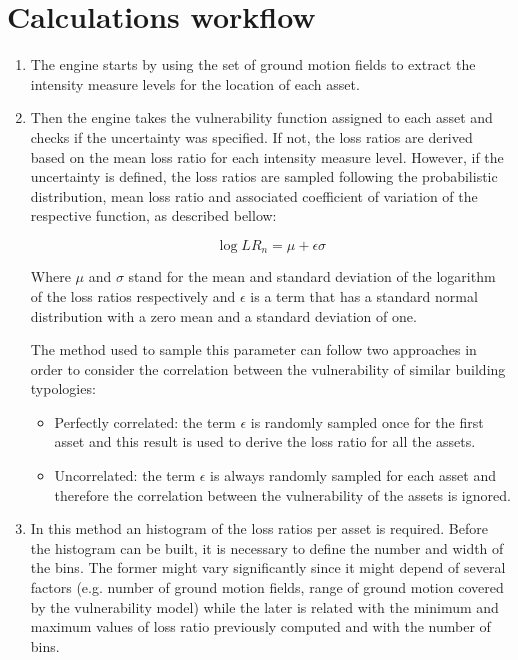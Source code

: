 \section{Calculations workflow}

\begin{enumerate}
\item The  engine starts by using the set of ground motion fields to extract the intensity measure levels for the location of each asset. 
 
\item Then the engine takes the vulnerability function assigned to each asset and checks if the uncertainty was specified. If not, the loss ratios are derived based on the mean loss ratio for each intensity measure level. However, if the uncertainty is defined, the loss ratios are sampled following the probabilistic distribution, mean loss ratio and associated coefficient of variation of the respective function, as described bellow:

\begin{equation}
\log{LR_n} = \mu + \epsilon\sigma
\end{equation}

Where $\mu$ and $\sigma$ stand for the mean and standard deviation of the logarithm of the loss ratios respectively and $\epsilon$ is a term that has a standard normal distribution with a zero mean and a standard deviation of one.  

The method used to sample this parameter can follow two approaches in order to consider the correlation between the vulnerability of similar building typologies:

\begin{itemize}

\item Perfectly correlated: the term $\epsilon$ is randomly sampled once for the first asset and this result is used to derive the loss ratio for all the assets. 

\item Uncorrelated: the term $\epsilon$ is always randomly sampled for each asset and therefore the correlation between the vulnerability of the assets is ignored.

\end{itemize}

\item In this method an histogram of the loss ratios per asset is required. Before the histogram can be built, it is necessary to define the number and width of the bins. The former might vary significantly since it might depend of several factors (e.g. number of ground motion fields, range of ground motion covered by the vulnerability model) while the later is related with the minimum and maximum values of loss ratio previously computed and with the number of bins. 


\end{enumerate}
